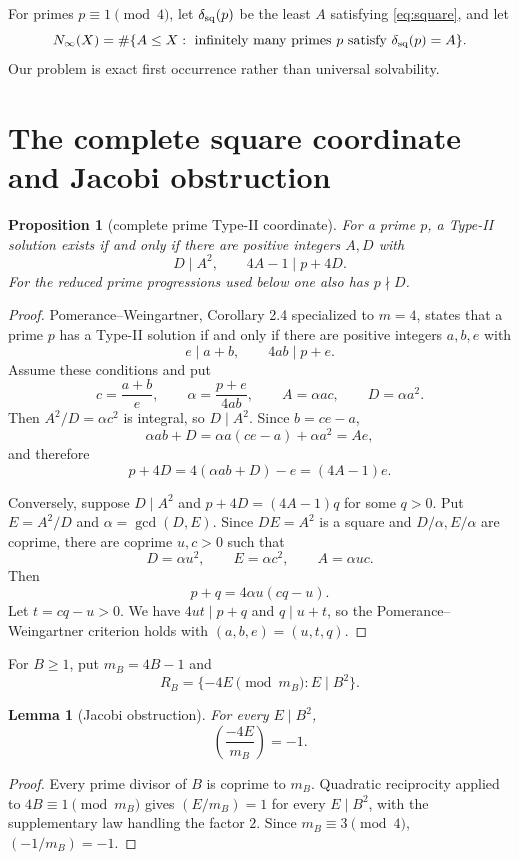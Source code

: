 \documentclass[11pt]{article}
\newtheorem{lemma}[theorem]{Lemma}
\newtheorem{proposition}[theorem]{Proposition}
\theoremstyle{definition}
\newcommand{\sqdepth}{\delta_{\rm sq}}
\begin{document}
For primes $p\equiv1\pmod4$, let $\sqdepth(p)$ be the least $A$ satisfying \eqref{eq:square}, and let
\[
N_\infty(X)=\#\{A\le X:\text{ infinitely many primes }p\text{ satisfy }\sqdepth(p)=A\}.
\]
Our problem is exact first occurrence rather than universal solvability.

\section{The complete square coordinate and Jacobi obstruction}
\begin{proposition}[complete prime Type-II coordinate]\label{prop:complete}
For a prime $p$, a Type-II solution exists if and only if there are positive integers $A,D$ with
\[
D\mid A^2,\qquad 4A-1\mid p+4D.
\]
For the reduced prime progressions used below one also has $p\nmid D$.
\end{proposition}

\begin{proof}
Pomerance--Weingartner, Corollary 2.4 specialized to $m=4$, states that a prime $p$ has a Type-II solution if and only if there are positive integers $a,b,e$ with
\[
e\mid a+b,\qquad 4ab\mid p+e.
\]
Assume these conditions and put
\[
c=\frac{a+b}{e},\qquad \alpha=\frac{p+e}{4ab},\qquad A=\alpha ac,\qquad D=\alpha a^2.
\]
Then $A^2/D=\alpha c^2$ is integral, so $D\mid A^2$. Since $b=ce-a$,
\[
\alpha ab+D=\alpha a(ce-a)+\alpha a^2=Ae,
\]
and therefore
\[
p+4D=4(\alpha ab+D)-e=(4A-1)e.
\]

Conversely, suppose $D\mid A^2$ and $p+4D=(4A-1)q$ for some $q>0$. Put $E=A^2/D$ and $\alpha=\gcd(D,E)$. Since $DE=A^2$ is a square and $D/\alpha,E/\alpha$ are coprime, there are coprime $u,c>0$ such that
\[
D=\alpha u^2,\qquad E=\alpha c^2,\qquad A=\alpha uc.
\]
Then
\[
p+q=4\alpha u(cq-u).
\]
Let $t=cq-u>0$. We have $4ut\mid p+q$ and $q\mid u+t$, so the Pomerance--Weingartner criterion holds with $(a,b,e)=(u,t,q)$.
\end{proof}

For $B\ge1$, put $m_B=4B-1$ and
\[
R_B=\{-4E\pmod{m_B}:E\mid B^2\}.
\]

\begin{lemma}[Jacobi obstruction]\label{lem:jacobi}
For every $E\mid B^2$,
\[
\left(\frac{-4E}{m_B}\right)=-1.
\]
\end{lemma}

\begin{proof}
Every prime divisor of $B$ is coprime to $m_B$. Quadratic reciprocity applied to $4B\equiv1\pmod{m_B}$ gives $(E/m_B)=1$ for every $E\mid B^2$, with the supplementary law handling the factor $2$. Since $m_B\equiv3\pmod4$, $(-1/m_B)=-1$.
\end{proof}
\end{document}
